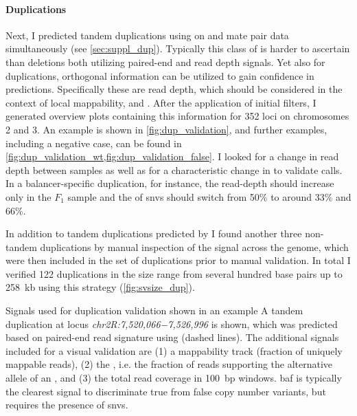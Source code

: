 \paragraph{Duplications} Next, I predicted tandem duplications using \delly
on \wgs and mate pair data simultaneously (see
\cref{sec:suppl_dup}). Typically this class of \sv is harder to
ascertain than deletions both utilizing paired-end and read depth signals.
Yet also for duplications, orthogonal information can be utilized to
gain confidence in predictions. Specifically these are read depth, which should
be considered in the context of local mappability, and \baf.
After the application of initial filters, I generated overview plots containing
this information for 352 loci on chromosomes 2 and 3. An example is shown in
\cref{fig:dup_validation}, and further examples, including a negative case, can
be found in \cref{fig:dup_validation_wt,fig:dup_validation_false}.
I looked for a change in read depth between samples as well as for a characteristic
change in \baf to validate calls. In a balancer-specific duplication,
for instance, the read-depth should increase only
in the $F_1$ sample and the \baf of \acp{snv} should switch from
50\% to around 33\% and 66\%.

In addition to tandem duplications predicted by \delly I found another three
non-tandem duplications by manual inspection of the \baf signal
across the genome, which were then included in the set of duplications prior
to manual validation. In total I verified 122
duplications in the size range from several hundred base pairs up to 258~kb
using this strategy (\cref{fig:svsize_dup}).

    {Signals used for duplication validation shown in an example}
    {A tandem duplication at locus \textit{chr2R:7,520,066−7,526,996} is shown,
    which was predicted based on paired-end read signature using \delly
    (dashed lines). The additional signals
    included for a visual validation are (1) a mappability track (fraction
    of uniquely mappable reads), (2) the \baf, i.e. the fraction of
    reads supporting the alternative allele of an \snv, and (3)
    the total read coverage in 100~bp windows. \Ac{baf}
    is typically the clearest signal to discriminate true from false
    copy number variants, but requires the presence of \acp{snv}.}

